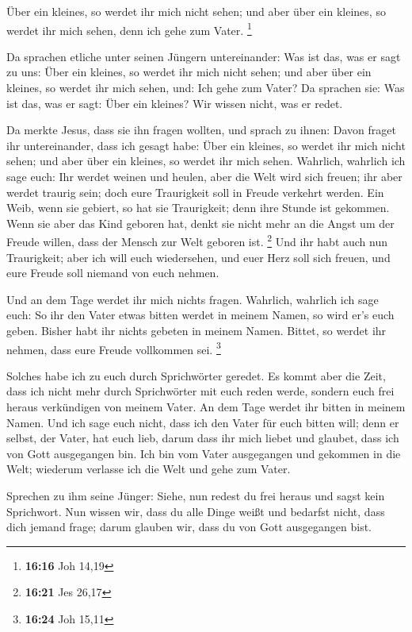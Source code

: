  Über ein kleines, so werdet ihr mich nicht sehen; und
aber über ein kleines, so werdet ihr mich sehen, denn ich gehe zum
Vater. \footnote{\textbf{16:16} Joh 14,19}

 Da sprachen etliche unter seinen Jüngern untereinander:
Was ist das, was er sagt zu uns: Über ein kleines, so werdet ihr mich
nicht sehen; und aber über ein kleines, so werdet ihr mich sehen, und:
Ich gehe zum Vater?  Da sprachen sie: Was ist das, was er
sagt: Über ein kleines? Wir wissen nicht, was er redet.

 Da merkte Jesus, dass sie ihn fragen wollten, und sprach
zu ihnen: Davon fraget ihr untereinander, dass ich gesagt habe: Über ein
kleines, so werdet ihr mich nicht sehen; und aber über ein kleines, so
werdet ihr mich sehen.  Wahrlich, wahrlich ich sage euch:
Ihr werdet weinen und heulen, aber die Welt wird sich freuen; ihr aber
werdet traurig sein; doch eure Traurigkeit soll in Freude verkehrt
werden.  Ein Weib, wenn sie gebiert, so hat sie
Traurigkeit; denn ihre Stunde ist gekommen. Wenn sie aber das Kind
geboren hat, denkt sie nicht mehr an die Angst um der Freude willen,
dass der Mensch zur Welt geboren ist. \footnote{\textbf{16:21} Jes 26,17}
 Und ihr habt auch nun Traurigkeit; aber ich will euch
wiedersehen, und euer Herz soll sich freuen, und eure Freude soll
niemand von euch nehmen.

 Und an dem Tage werdet ihr mich nichts fragen. Wahrlich,
wahrlich ich sage euch: So ihr den Vater etwas bitten werdet in meinem
Namen, so wird er's euch geben.  Bisher habt ihr nichts
gebeten in meinem Namen. Bittet, so werdet ihr nehmen, dass eure Freude
vollkommen sei. \footnote{\textbf{16:24} Joh 15,11}

 Solches habe ich zu euch durch Sprichwörter geredet. Es
kommt aber die Zeit, dass ich nicht mehr durch Sprichwörter mit euch
reden werde, sondern euch frei heraus verkündigen von meinem Vater.
 An dem Tage werdet ihr bitten in meinem Namen. Und ich
sage euch nicht, dass ich den Vater für euch bitten will;
 denn er selbst, der Vater, hat euch lieb, darum dass ihr
mich liebet und glaubet, dass ich von Gott ausgegangen bin.
 Ich bin vom Vater ausgegangen und gekommen in die Welt;
wiederum verlasse ich die Welt und gehe zum Vater.

 Sprechen zu ihm seine Jünger: Siehe, nun redest du frei
heraus und sagst kein Sprichwort.  Nun wissen wir, dass
du alle Dinge weißt und bedarfst nicht, dass dich jemand frage; darum
glauben wir, dass du von Gott ausgegangen bist.


